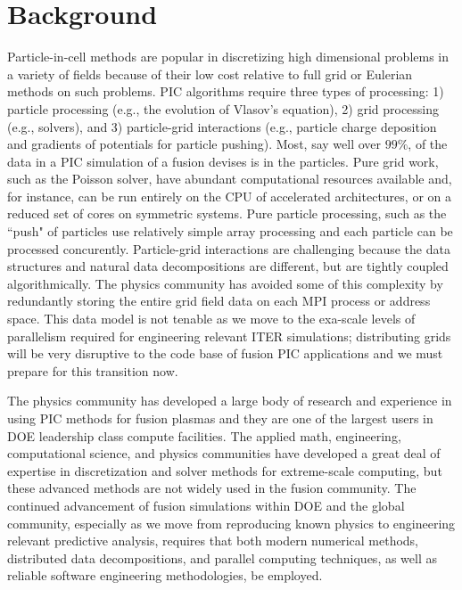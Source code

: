 \documentclass[review]{siamart}
\begin{document}
\section{Background}

Particle-in-cell methods are popular in discretizing high dimensional problems in a variety of fields because of their low cost relative to full grid or Eulerian methods on such problems.
PIC algorithms require three types of processing: 1) particle processing (e.g., the evolution of Vlasov's equation), 2) grid processing (e.g., solvers), and 3) particle-grid interactions (e.g., particle charge deposition and gradients of potentials for particle pushing).
Most, say well over $99\%$, of the data in a PIC simulation of a fusion devises is in the particles.
Pure grid work, such as the Poisson solver, have abundant computational resources available and, for instance, can be run entirely on the CPU of accelerated architectures, or on a reduced set of cores on symmetric systems.
Pure particle processing, such as the ``push" of particles use relatively simple array processing and each particle can be processed concurently.
Particle-grid interactions are challenging because the data structures and natural data decompositions are different, but are tightly coupled algorithmically.
The physics community has avoided some of this complexity by redundantly storing the entire grid field data on each MPI process or address space.
This data model is not tenable as we move to the exa-scale levels of parallelism required for engineering relevant ITER simulations; distributing grids will be very disruptive to the code base of fusion PIC applications and we must prepare for this transition now.

The physics community has developed a large body of research and experience in using PIC methods for fusion plasmas and they are one of the largest users in DOE leadership class compute facilities.
The applied math, engineering, computational science, and physics communities have developed a great deal of expertise in discretization and solver methods for extreme-scale computing, but these advanced methods are not widely used in the fusion community.
The continued advancement of fusion simulations within DOE and the global community, especially as we move from reproducing known physics to engineering relevant predictive analysis, requires that both modern numerical methods, distributed data decompositions, and parallel computing techniques, as well as reliable software engineering methodologies, be employed.
\end{document}
